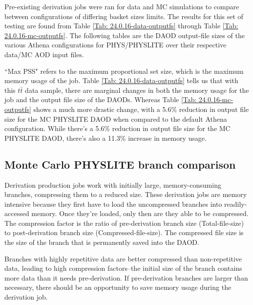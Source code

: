 Pre-existing derivation jobs were ran for data and MC simulations to compare between configurations of differing basket sizes limits. 
The results for this set of testing are found from Table \ref{Tab: 24.0.16-data-outputfs} through Table \ref{Tab: 24.0.16-mc-outputfs}. 
The following tables are the DAOD output-file sizes of the various Athena configurations for PHYS/PHYSLITE over their respective data/MC AOD input files. 





``Max PSS" refers to the maximum proportional set size, which is the maximum memory usage of the job.
Table \ref{Tab: 24.0.16-data-outputfs} tells us that with this $t\bar{t}$ data sample, there are marginal changes in both the memory usage for the job and the output file size of the DAODs. 
Whereas Table \ref{Tab: 24.0.16-mc-outputfs} shows a much more drastic change, with a 5.6\% reduction in output file size for the MC PHYSLITE DAOD when compared to the default Athena configuration.
While there's a 5.6\% reduction in output file size for the MC PHYSLITE DAOD, there's also a 11.3\% increase in memory usage. 


\subsection{Monte Carlo PHYSLITE branch comparison}
\label{sec:DAODProd_Results_Monte}

Derivation production jobs work with initially large, memory-consuming branches, compressing them to a reduced size. 
These derivation jobs are memory intensive because they first have to load the uncompressed branches into readily-accessed memory. 
Once they're loaded, only then are they able to be compressed. 
The compression factor is the ratio of pre-derivation branch size (Total-file-size) to post-derivation branch size (Compressed-file-size). 
The compressed file size is the size of the branch that is permanently saved into the DAOD.  

Branches with highly repetitive data are better compressed than non-repetitive data, leading to high compression factors--the initial size of the branch contains more data than it needs pre-derivation. 
If pre-derivation branches are larger than necessary, there should be an opportunity to save memory usage during the derivation job. 






